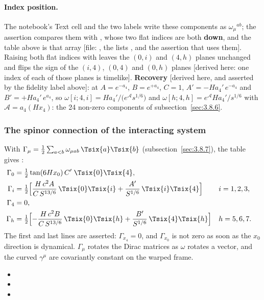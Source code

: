 \paragraph{Index position.} The notebook's Text cell and the two labels write these components as
$\omega_\mu{}^{ab}$; the assertion compares them with , whose
two flat indices are both \textbf{down}, and the table above is that array [file:
, the lists ,  and the
assertion that uses them]. Raising both flat indices with  leaves the $(0,i)$ and $(4,h)$
planes unchanged and flips the sign of the $(i,4)$, $(0,4)$ and $(0,h)$ planes [derived here: one index
of each of those planes is timelike]. \textbf{Recovery} [derived here, and asserted by the fidelity
label above]: at $A=e^{-a_4}$, $B=e^{+a_4}$, $C=1$, $A'=-Ha_4'\,e^{-a_4}$ and $B'=+Ha_4'\,e^{a_4}$, so
$\omega[i;4,i]=Ha_4'/\bigl(e^{\mathcal A}s^{1/6}\bigr)$ and $\omega[h;4,h]=e^{\mathcal A}Ha_4'/s^{1/6}$ with
$\mathcal A=a_4(Hx_4)$: the 24 non-zero components of subsection~\ref{sec:3.8.6}.

\subsubsection{The spinor connection of the interacting system}
\label{sec:4.4.3}

With $\Gamma_\mu=\tfrac12\sum_{a<b}\omega_{\mu ab}\,\Tsix{a}\Tsix{b}$ (subsection~\ref{sec:3.8.7}), the table
gives \cfderived:
\begin{align*}
  \Gamma_0&=\tfrac12\tan(6Hx_0)\,C'\;\Tsix{0}\Tsix{4},\\
  \Gamma_i&=\tfrac12\Bigl[\frac{H\,c^2A}{C\,S^{13/6}}\,\Tsix{0}\Tsix{i}+\frac{A'}{S^{1/6}}\,\Tsix{i}\Tsix{4}\Bigr] &&i=1,2,3,\\
  \Gamma_4&=0,\\
  \Gamma_h&=\tfrac12\Bigl[-\frac{H\,c^2B}{C\,S^{13/6}}\,\Tsix{0}\Tsix{h}+\frac{B'}{S^{1/6}}\,\Tsix{4}\Tsix{h}\Bigr] &&h=5,6,7.
\end{align*}
The first and last lines are asserted: $\Gamma_{x_4}=0$, and $\Gamma_{x_0}$ is not zero as soon as the
$x_0$ direction is dynamical. $\Gamma_\mu$ rotates the Dirac matrices as $\omega$ rotates a vector, and the
curved $\gamma^\mu$ are covariantly constant on the warped frame. 
\begin{itemize}
  \item {}
  \item {}
  \item {}
\end{itemize}

